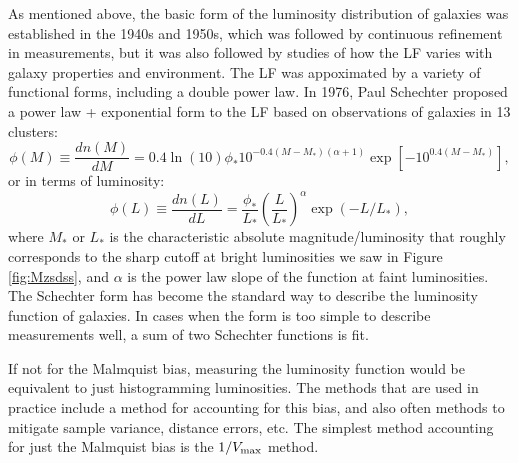 As mentioned above, the basic form of the luminosity distribution of galaxies was established in the 1940s and 1950s, which was followed by continuous refinement in measurements, but it was also followed by studies of how the LF varies with galaxy properties and environment. The LF was appoximated by a variety of functional forms, including a double power law. 
In 1976, Paul Schechter proposed a power law + exponential form to the LF \href{http://adsabs.harvard.edu/abs/1976ApJ...203..297S}{\citep{schechter76}} based on observations of galaxies in 13 clusters:
\begin{equation}
\phi(M)\equiv \frac{dn(M)}{dM}=0.4\ln(10)\phi_* 10^{-0.4(M-M_*)(\alpha+1)}\exp\left[-10^{0.4(M-M_*)}\right],
\label{eq:lfMschechter}
\end{equation}
or in terms of luminosity:
\begin{equation}
\phi(L)\equiv\frac{dn(L)}{dL}=\frac{\phi_*}{L_*} \left(\frac{L}{L_*}\right)^{\alpha}\exp(-L/L_*),
\label{eq:lfLschechter}
\end{equation}
where $M_*$ or $L_*$ is the characteristic absolute magnitude/luminosity that roughly corresponds to the sharp cutoff at bright luminosities we saw in Figure \ref{fig:Mzsdss}, and $\alpha$ is the power law slope of the function at faint luminosities. The Schechter form has become the standard way to describe the luminosity function of galaxies. In cases when the form is too simple to describe measurements well, a sum of two Schechter functions is fit. 

If not for the Malmquist bias, measuring the luminosity function would be equivalent to just histogramming luminosities. The methods that are used in practice include a method for accounting for this bias, and also often methods to mitigate sample variance, distance errors, etc. The simplest method accounting for just the Malmquist bias is the $1/V_{\rm max}$ method.

